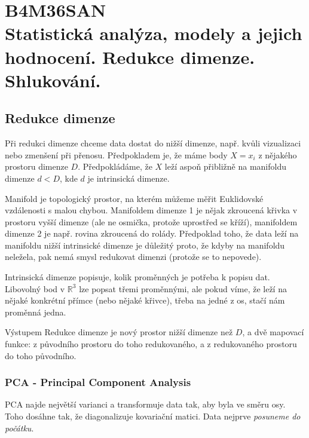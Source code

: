 \chapter[Statistická analýza dat]{B4M36SAN \\[1ex]\Large{Statistická analýza, modely a jejich hodnocení. Redukce dimenze. Shlukování.}}

\section{Redukce dimenze}

Při redukci dimenze chceme data dostat do nižší dimenze, např. kvůli vizualizaci nebo zmenšení při přenosu. Předpokladem je, že máme body $X = {x_i}$ z nějakého prostoru dimenze $D$. Předpokládáme, že $X$ leží aspoň přibližně na manifoldu dimenze $d < D$, kde $d$ je intrinsická dimenze.

Manifold je topologický prostor, na kterém můžeme měřit Euklidovské vzdálenosti s malou chybou. Manifoldem dimenze 1 je nějak zkroucená křivka v prostoru vyšší dimenze (ale ne osmička, protože uprostřed se kříží), manifoldem dimenze 2 je např. rovina zkroucená do rolády. Předpoklad toho, že data leží na manifoldu nižší intrinsické dimenze je důležitý proto, že kdyby na manifoldu neležela, pak nemá smysl redukovat dimenzi (protože se to nepovede).

Intrinsická dimenze popisuje, kolik proměnných je potřeba k popisu dat. Libovolný bod v $\mathbb{R}^3$ lze popsat třemi proměnnými, ale pokud víme, že leží na nějaké konkrétní přímce (nebo nějaké křivce), třeba na jedné z os, stačí nám proměnná jedna.

Výstupem Redukce dimenze je nový prostor nižší dimenze než $D$, a dvě mapovací funkce: z původního prostoru do toho redukovaného, a z redukovaného prostoru do toho původního.

\subsection{PCA - Principal Component Analysis}

PCA najde největší varianci a transformuje data tak, aby byla ve směru osy. Toho dosáhne tak, že diagonalizuje kovariační matici. Data nejprve \textit{posuneme do počátku}.

